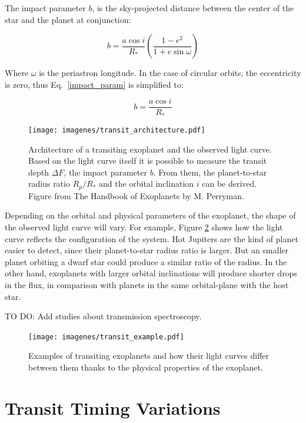 The impact parameter $b$, is the sky-projected distance between the center of the star and the planet at conjunction:

\begin{equation}
    b = \frac{a\cos{i}}{R_{*}}\left(\frac{1-e^2}{1+e\sin{\omega}}\right)
\label{impact_param}
\end{equation}

Where $\omega$ is the periastron longitude. In the case of circular orbits, the eccentricity is zero, thus Eq.~\ref{impact_param} is simplified to:

\begin{equation}
    b = \frac{a\cos{i}}{R_{*}}
\label{impact_param_simple}
\end{equation}

\begin{figure}[H]
\centering
\texttt{[image: imagenes/transit\_architecture.pdf]}
\caption{Architecture of a transiting exoplanet and the observed light curve. Based on the light curve itself it is possible to measure the transit depth $\Delta F$, the impact parameter $b$. From them, the planet-to-star radius ratio $R_{p}/R_{*}$ and the orbital inclination $i$ can be derived. Figure from The Handbook of Exoplanets by M. Perryman.}
\label{transit}
\end{figure}

Depending on the orbital and physical parameters of the exoplanet, the shape of the observed light curve will vary. For example, Figure \ref{transit_examples} shows how the light curve reflects the configuration of the system. Hot Jupiters are the kind of planet easier to detect, since their planet-to-star radius ratio is larger. But an smaller planet orbiting a dwarf star could produce a similar ratio of the radius. In the other hand, exoplanets with larger orbital inclinations will produce shorter drops in the flux, in comparison with planets in the same orbital-plane with the host star.

TO DO: Add studies about transmission spectroscopy.            

\begin{figure}[H]
\centering
\texttt{[image: imagenes/transit\_example.pdf]}
\caption{Examples of transiting exoplanets and how their light curves differ between them thanks to the physical properties of the exoplanet.}
\label{transit_examples}
\end{figure}



\section{Transit Timing Variations}

